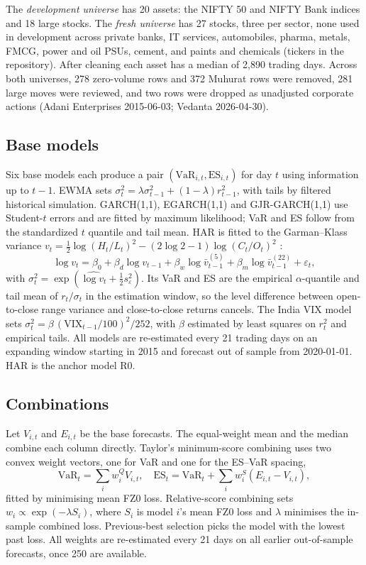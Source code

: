 \documentclass[conference]{IEEEtran}
\begin{document}
The \emph{development universe} has 20 assets: the NIFTY 50 and NIFTY Bank indices and 18 large stocks. The \emph{fresh universe} has 27 stocks, three per sector, none used in development across private banks, IT services, automobiles, pharma, metals, FMCG, power and oil PSUs, cement, and paints and chemicals (tickers in the repository). After cleaning each asset has a median of 2,890 trading days. Across both universes, 278 zero-volume rows and 372 Muhurat rows were removed, 281 large moves were reviewed, and two rows were dropped as unadjusted corporate actions (Adani Enterprises 2015-06-03; Vedanta 2026-04-30).

\subsection{Base models}
Six base models each produce a pair $(\mathrm{VaR}_{i,t},\mathrm{ES}_{i,t})$ for day $t$ using information up to $t-1$. EWMA \cite{riskmetrics1996} sets $\sigma^2_t=\lambda\sigma^2_{t-1}+(1-\lambda)r^2_{t-1}$, with tails by filtered historical simulation. GARCH(1,1), EGARCH(1,1) and GJR-GARCH(1,1) \cite{bollerslev1986,nelson1991,glosten1993} use Student-$t$ errors and are fitted by maximum likelihood; VaR and ES follow from the standardized $t$ quantile and tail mean. HAR \cite{corsi2009} is fitted to the Garman--Klass variance $v_t=\tfrac12\log(H_t/L_t)^2-(2\log2-1)\log(C_t/O_t)^2$ \cite{garman1980}:
\begin{equation}
\log v_t=\beta_0+\beta_d\log v_{t-1}+\beta_w\log\bar v^{(5)}_{t-1}+\beta_m\log\bar v^{(22)}_{t-1}+\varepsilon_t,
\end{equation}
with $\sigma^2_t=\exp(\widehat{\log v_t}+\tfrac12 s^2_\varepsilon)$. Its VaR and ES are the empirical $\alpha$-quantile and tail mean of $r_t/\sigma_t$ in the estimation window, so the level difference between open-to-close range variance and close-to-close returns cancels. The India VIX model sets $\sigma^2_t=\beta\,(\mathrm{VIX}_{t-1}/100)^2/252$, with $\beta$ estimated by least squares on $r_t^2$ and empirical tails.
All models are re-estimated every 21 trading days on an expanding window starting in 2015 and forecast out of sample from 2020-01-01. HAR is the anchor model R0.

\subsection{Combinations}
Let $V_{i,t}$ and $E_{i,t}$ be the base forecasts. The equal-weight mean and the median combine each column directly. Taylor's minimum-score combining \cite{taylor2020} uses two convex weight vectors, one for VaR and one for the ES--VaR spacing,
\begin{equation}
\mathrm{VaR}_t=\textstyle\sum_i w^Q_i V_{i,t},\quad \mathrm{ES}_t=\mathrm{VaR}_t+\sum_i w^S_i(E_{i,t}-V_{i,t}),
\end{equation}
fitted by minimising mean FZ0 loss. Relative-score combining sets $w_i\propto\exp(-\lambda S_i)$, where $S_i$ is model $i$'s mean FZ0 loss and $\lambda$ minimises the in-sample combined loss. Previous-best selection picks the model with the lowest past loss. All weights are re-estimated every 21 days on all earlier out-of-sample forecasts, once 250 are available.
\end{document}
